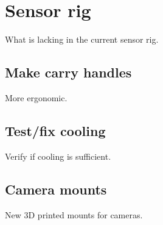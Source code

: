 \chapter{Sensor rig}
What is lacking in the current sensor rig.


\section{Make carry handles}
More ergonomic.

\section{Test/fix cooling}
Verify if cooling is sufficient.

\section{Camera mounts}
New 3D printed mounts for cameras.
